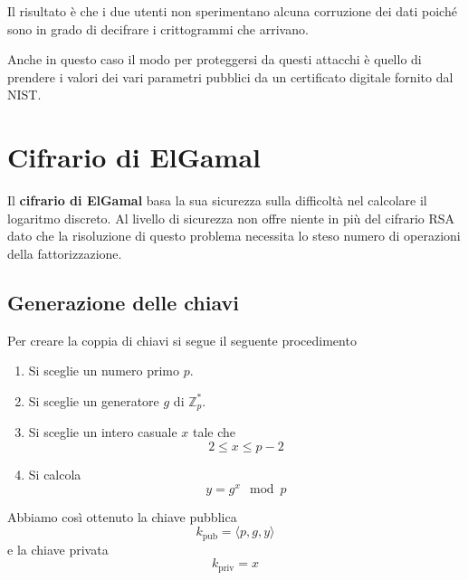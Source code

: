 Il risultato \`e che i due utenti non sperimentano alcuna corruzione dei dati poich\'e sono in grado di decifrare
i crittogrammi che arrivano.

Anche in questo caso il modo per proteggersi da questi attacchi \`e quello di prendere i valori dei vari parametri
pubblici da un certificato digitale fornito dal NIST.

\section{Cifrario di ElGamal}
Il \textbf{cifrario di ElGamal} basa la sua sicurezza sulla difficolt\`a nel calcolare il logaritmo discreto. Al
livello di sicurezza non offre niente in pi\`u del cifrario RSA dato che la risoluzione di questo problema necessita
lo steso numero di operazioni della fattorizzazione.

\subsection{Generazione delle chiavi}
Per creare la coppia di chiavi si segue il seguente procedimento
\begin{enumerate}
	\item Si sceglie un numero primo $p$.
	\item Si sceglie un generatore $g$ 	di $\mathbb{Z}_p^*$.
	\item Si sceglie un intero casuale $x$ tale che
	      \[ 2 \leq x \leq p-2 \]
	\item Si calcola
	      \[ y = g^x \mod{p} \]
\end{enumerate}
Abbiamo cos\`i ottenuto la chiave pubblica
\[ k_\text{pub} = \langle p, g, y \rangle \]
e la chiave privata
\[ k_\text{priv} = x \]

